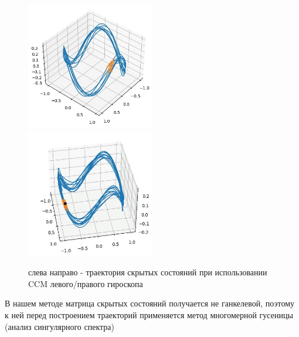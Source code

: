 \documentclass[12pt, twoside]{article}
\begin{document}
\begin{figure}
	\includegraphics[width = 0.5\textwidth]{images/trajectory_CCM.jpg} \hfill
	\includegraphics[width = 0.5\textwidth]{images/trajectory_CCM_right.jpg}
	\caption{слева направо - траектория скрытых состояний при использовании CCM левого/правого гироскопа\label{trajectory}}
\end{figure}
	
	В нашем методе матрица скрытых состояний получается не ганкелевой, поэтому к ней перед построением траекторий применяется метод многомерной гусеницы (анализ сингулярного спектра) \cite{SSA1997}
\end{document}
